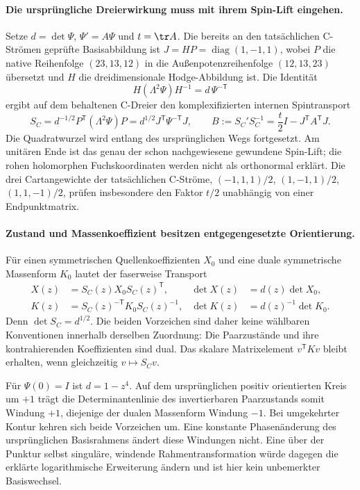\paragraph{Die ursprüngliche Dreierwirkung muss mit ihrem Spin-Lift eingehen.}
Setze $d=\det\Psi$, $\Psi'=A\Psi$ und $t=\tr A$.
Die bereits an den tatsächlichen C-Strömen geprüfte Basisabbildung ist
$J=HP=\operatorname{diag}(1,-1,1)$, wobei $P$ die native Reihenfolge
$(23,13,12)$ in die Außenpotenzreihenfolge $(12,13,23)$ übersetzt und
$H$ die dreidimensionale Hodge-Abbildung ist. Die Identität
\[
 H(\Lambda^2\Psi)H^{-1}=d\,\Psi^{-\mathsf T}
\]
ergibt auf dem behaltenen C-Dreier den komplexifizierten internen Spintransport
\begin{equation}\label{eq:massspinconnection}
 S_C=d^{-1/2}P^{\mathsf T}(\Lambda^2\Psi)P
     =d^{1/2}J^{\mathsf T}\Psi^{-\mathsf T}J,
 \qquad
 B:=S_C'S_C^{-1}=\frac t2 I-J^{\mathsf T}A^{\mathsf T}J.
\end{equation}
Die Quadratwurzel wird entlang des ursprünglichen Wegs fortgesetzt.
Am unitären Ende ist das genau der schon nachgewiesene gewundene Spin-Lift;
die rohen holomorphen Fuchskoordinaten werden nicht als orthonormal erklärt.
Die drei Cartangewichte der tatsächlichen C-Ströme,
$(-1,1,1)/2$, $(1,-1,1)/2$, $(1,1,-1)/2$, prüfen insbesondere den
Faktor $t/2$ unabhängig von einer Endpunktmatrix.

\paragraph{Zustand und Massenkoeffizient besitzen entgegengesetzte Orientierung.}
Für einen symmetrischen Quellenkoeffizienten $X_0$ und eine duale symmetrische
Massenform $K_0$ lautet der faserweise Transport
\begin{equation}\label{eq:massdeterminantcarry}
 \begin{aligned}
 X(z)&=S_C(z)X_0S_C(z)^{\mathsf T},
 &\det X(z)&=d(z)\det X_0,\\
 K(z)&=S_C(z)^{-\mathsf T}K_0S_C(z)^{-1},
 &\det K(z)&=d(z)^{-1}\det K_0.
 \end{aligned}
\end{equation}
Denn $\det S_C=d^{1/2}$. Die beiden Vorzeichen sind daher keine
wählbaren Konventionen innerhalb derselben Zuordnung: Die Paarzustände und
ihre kontrahierenden Koeffizienten sind dual. Das skalare Matrixelement
$v^{\mathsf T}K v$ bleibt erhalten, wenn gleichzeitig $v\mapsto S_Cv$.

Für $\Psi(0)=I$ ist $d=1-z^4$. Auf dem ursprünglichen positiv orientierten
Kreis um $+1$ trägt die Determinantenlinie des invertierbaren Paarzustands
somit Windung $+1$, diejenige der dualen Massenform Windung $-1$.
Bei umgekehrter Kontur kehren sich beide Vorzeichen um. Eine konstante
Phasenänderung des ursprünglichen Basisrahmens ändert diese Windungen nicht.
Eine über der Punktur selbst singuläre, windende Rahmentransformation würde
dagegen die erklärte logarithmische Erweiterung ändern und ist hier kein
unbemerkter Basiswechsel.

